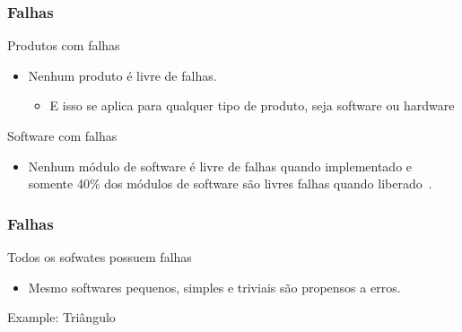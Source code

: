 \begin{frame}[parent={cmap:software-testing-foundations}, hasprev=false, hasnext=true]
\frametitle{Falhas}
\label{concept:defect}

\begin{block:fact}{Produtos com falhas}
\begin{itemize}
    \item Nenhum produto é livre de falhas.
    \begin{itemize}
		\item E isso se aplica para qualquer tipo de produto, seja software ou hardware
    \end{itemize}
\end{itemize}

\hfill
{}
\end{block:fact}


\begin{block:fact}{Software com falhas}
\begin{itemize}
	\item Nenhum módulo de software é livre de falhas quando implementado e somente 40\% dos módulos de software são livres falhas quando liberado~\cite{shull-etal:2002}.
\end{itemize}
\hfill
{}
\end{block:fact}
\end{frame}


\begin{frame}[hasprev=true, hasnext=true]
\frametitle{Falhas}
\label{concept:defect-detection}

\begin{block:fact}{Todos os sofwates possuem falhas}
\begin{itemize}
	\item Mesmo softwares pequenos, simples e triviais são propensos a erros.
\end{itemize}
\end{block:fact}

\begin{block}{Example: Triângulo}
\centering
{}
\end{block}
\end{frame}


